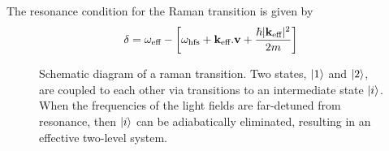The resonance condition for the Raman transition is given by 
\begin{equation}
  \delta = \omega_\textnormal{eff} - \left[\omega_\textnormal{hfs} + {\textbf k_\textnormal{eff}} .
\textbf{v} + \frac{\hbar |{\textbf k_\textnormal{eff}}|^2}{2m}\right]
  \label{eq:raman_detuning}
\end{equation}
\begin{figure}[htpb]
  \centering
  \fontsize{16pt}{16pt}
  \resizebox{0.4\textwidth}{!}{}
  \caption[Schematic diagram of a raman transition.]{Schematic diagram of a raman transition. Two states,
  $\ket{1}$ and $\ket{2}$, are coupled to each other via transitions
  to an
intermediate state $\ket{i}$. When the frequencies of the light
fields are
far-detuned from resonance,
then $\ket{i}$ can be adiabatically eliminated, resulting in an
effective two-level system.}
  \label{fig:raman_model}
\end{figure}
